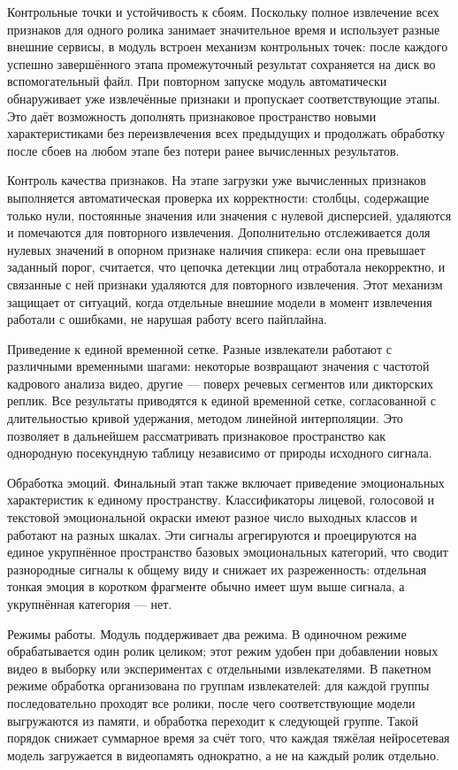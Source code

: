 \documentclass[times]{itmo-student-thesis}
\begin{document}
Контрольные точки и устойчивость к сбоям. Поскольку полное извлечение всех признаков для одного ролика занимает значительное время и использует разные внешние сервисы, в модуль встроен механизм контрольных точек: после каждого успешно завершённого этапа промежуточный результат сохраняется на диск во вспомогательный файл. При повторном запуске модуль автоматически обнаруживает уже извлечённые признаки и пропускает соответствующие этапы. Это даёт возможность дополнять признаковое пространство новыми характеристиками без переизвлечения всех предыдущих и продолжать обработку после сбоев на любом этапе без потери ранее вычисленных результатов.

Контроль качества признаков. На этапе загрузки уже вычисленных признаков выполняется автоматическая проверка их корректности: столбцы, содержащие только нули, постоянные значения или значения с нулевой дисперсией, удаляются и помечаются для повторного извлечения. Дополнительно отслеживается доля нулевых значений в опорном признаке наличия спикера: если она превышает заданный порог, считается, что цепочка детекции лиц отработала некорректно, и связанные с ней признаки удаляются для повторного извлечения. Этот механизм защищает от ситуаций, когда отдельные внешние модели в момент извлечения работали с ошибками, не нарушая работу всего пайплайна.

Приведение к единой временной сетке. Разные извлекатели работают с различными временными шагами: некоторые возвращают значения с частотой кадрового анализа видео, другие — поверх речевых сегментов или дикторских реплик. Все результаты приводятся к единой временной сетке, согласованной с длительностью кривой удержания, методом линейной интерполяции. Это позволяет в дальнейшем рассматривать признаковое пространство как однородную посекундную таблицу независимо от природы исходного сигнала.

Обработка эмоций. Финальный этап также включает приведение эмоциональных характеристик к единому пространству. Классификаторы лицевой, голосовой и текстовой эмоциональной окраски имеют разное число выходных классов и работают на разных шкалах. Эти сигналы агрегируются и проецируются на единое укрупнённое пространство базовых эмоциональных категорий, что сводит разнородные сигналы к общему виду и снижает их разреженность: отдельная тонкая эмоция в коротком фрагменте обычно имеет шум выше сигнала, а укрупнённая категория — нет.

Режимы работы. Модуль поддерживает два режима. В одиночном режиме обрабатывается один ролик целиком; этот режим удобен при добавлении новых видео в выборку или экспериментах с отдельными извлекателями. В пакетном режиме обработка организована по группам извлекателей: для каждой группы последовательно проходят все ролики, после чего соответствующие модели выгружаются из памяти, и обработка переходит к следующей группе. Такой порядок снижает суммарное время за счёт того, что каждая тяжёлая нейросетевая модель загружается в видеопамять однократно, а не на каждый ролик отдельно.
\end{document}
